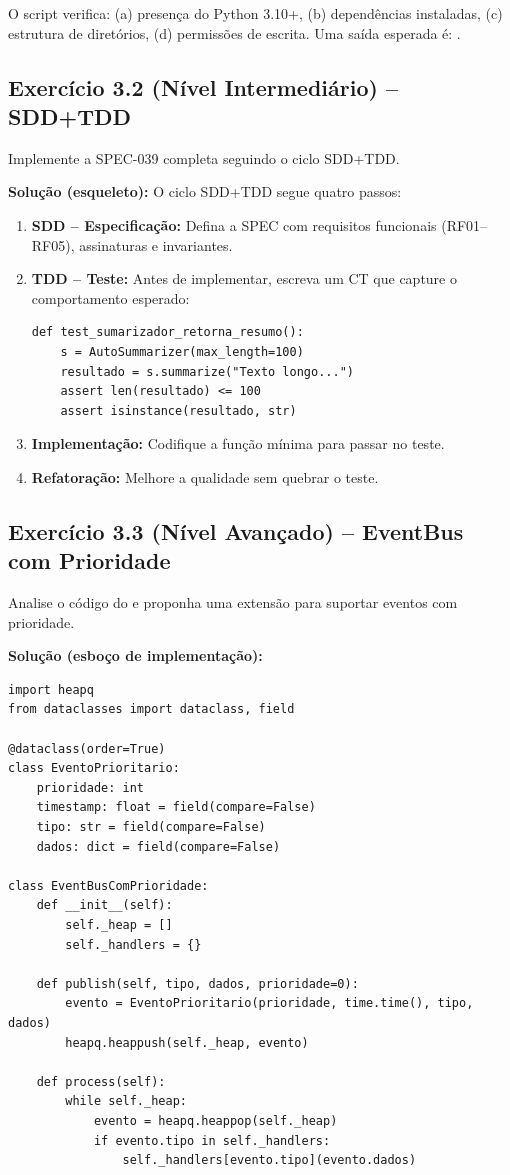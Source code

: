 O script verifica: (a) presença do Python 3.10+, (b) dependências
instaladas, (c) estrutura de diretórios, (d) permissões de escrita.
Uma saída esperada é: .

\subsection*{Exercício 3.2 (Nível Intermediário) -- SDD+TDD}
Implemente a SPEC-039 completa seguindo o ciclo SDD+TDD.

\textbf{Solução (esqueleto):} O ciclo SDD+TDD segue quatro passos:

\begin{enumerate}
\item \textbf{SDD -- Especificação:} Defina a SPEC com requisitos funcionais
(RF01--RF05), assinaturas e invariantes.
\item \textbf{TDD -- Teste:} Antes de implementar, escreva um CT que capture
o comportamento esperado:
\begin{lstlisting}[style=pythonstyle]
def test_sumarizador_retorna_resumo():
    s = AutoSummarizer(max_length=100)
    resultado = s.summarize("Texto longo...")
    assert len(resultado) <= 100
    assert isinstance(resultado, str)
\end{lstlisting}
\item \textbf{Implementação:} Codifique a função mínima para passar no teste.
\item \textbf{Refatoração:} Melhore a qualidade sem quebrar o teste.
\end{enumerate}

\subsection*{Exercício 3.3 (Nível Avançado) -- EventBus com Prioridade}
Analise o código do  e proponha uma extensão para
suportar eventos com prioridade.

\textbf{Solução (esboço de implementação):}
\begin{lstlisting}[style=pythonstyle]
import heapq
from dataclasses import dataclass, field

@dataclass(order=True)
class EventoPrioritario:
    prioridade: int
    timestamp: float = field(compare=False)
    tipo: str = field(compare=False)
    dados: dict = field(compare=False)

class EventBusComPrioridade:
    def __init__(self):
        self._heap = []
        self._handlers = {}

    def publish(self, tipo, dados, prioridade=0):
        evento = EventoPrioritario(prioridade, time.time(), tipo, dados)
        heapq.heappush(self._heap, evento)

    def process(self):
        while self._heap:
            evento = heapq.heappop(self._heap)
            if evento.tipo in self._handlers:
                self._handlers[evento.tipo](evento.dados)
\end{lstlisting}

